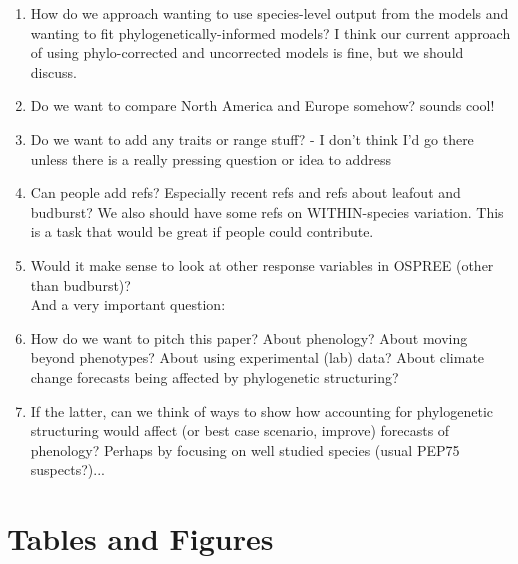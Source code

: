 \documentclass{article}\usepackage[]{graphicx}\usepackage[]{color}
\begin{document}
\begin{enumerate}
\item How do we approach wanting to use species-level output from the models and wanting to fit phylogenetically-informed models? I think our current approach of using phylo-corrected and uncorrected models is fine, but we should discuss.
\item Do we want to compare North America and Europe somehow? sounds cool!
\item Do we want to add any traits or range stuff? - I don't think I'd go there unless there is a really pressing question or idea to address
\item Can people add refs? Especially recent refs and refs about leafout and budburst? We also should have some refs on WITHIN-species variation. This is a task that would be great if people could contribute.
\item Would it make sense to look at other response variables in OSPREE (other than budburst)?\\

And a very important question:\\

\item How do we want to pitch this paper? About phenology? About moving beyond phenotypes? About using experimental (lab) data? About climate change forecasts being affected by phylogenetic structuring?

\item If the latter, can we think of ways to show how accounting for phylogenetic structuring would affect (or best case scenario, improve) forecasts of phenology? Perhaps by focusing on well studied species (usual PEP75 suspects?)... 

\end{enumerate}






\section*{Tables and Figures} 
\end{document}
